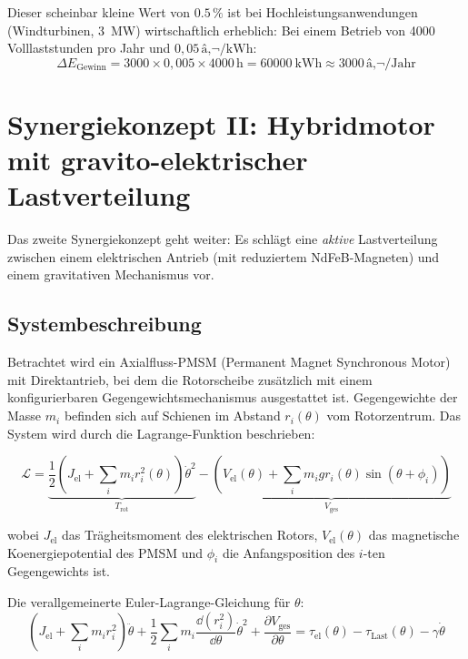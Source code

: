 ﻿\documentclass[12pt, a4paper]{report}
\theoremstyle{definition}
\theoremstyle{remark}
\begin{document}
Dieser scheinbar kleine Wert von $0.5\,\%$ ist bei Hochleistungsanwendungen
(Windturbinen, \SI{3}{\mega\watt}) wirtschaftlich erheblich: Bei einem Betrieb
von 4000 Volllaststunden pro Jahr und $0{,}05\,\text{â‚¬}/\si{\kilo\watt\hour}$:
\begin{equation}
  \Delta E_{\text{Gewinn}} = 3000 \times 0{,}005 \times 4000\,\text{h} = \SI{60000}{\kilo\watt\hour}
  \approx 3000\,\text{â‚¬/Jahr}
\end{equation}

\section{Synergiekonzept II: Hybridmotor mit gravito-elektrischer Lastverteilung}
\label{ssec:synergie2}

Das zweite Synergiekonzept geht weiter: Es schlägt eine \emph{aktive} Lastverteilung
zwischen einem elektrischen Antrieb (mit reduziertem NdFeB-Magneten) und einem
gravitativen Mechanismus vor.

\subsection{Systembeschreibung}

Betrachtet wird ein Axialfluss-PMSM (Permanent Magnet Synchronous Motor) mit
Direktantrieb, bei dem die Rotorscheibe zusätzlich mit einem konfigurierbaren
Gegengewichtsmechanismus ausgestattet ist. Gegengewichte der Masse $m_i$ befinden
sich auf Schienen im Abstand $r_i(\theta)$ vom Rotorzentrum. Das System wird durch
die Lagrange-Funktion beschrieben:

\begin{equation}
  \mathcal{L} = \underbrace{\frac{1}{2}\left(J_{\text{el}} + \sum_i m_i r_i^2(\theta)\right)
                            \dot\theta^2}_{T_{\text{rot}}}
              - \underbrace{\left(V_{\text{el}}(\theta) + \sum_i m_i g r_i(\theta)
                            \sin(\theta+\phi_i)\right)}_{V_{\text{ges}}}
  \label{eq:lagrange_hybrid}
\end{equation}

wobei $J_{\text{el}}$ das Trägheitsmoment des elektrischen Rotors,
$V_{\text{el}}(\theta)$ das magnetische Koenergiepotential des PMSM und
$\phi_i$ die Anfangsposition des $i$-ten Gegengewichts ist.

Die verallgemeinerte Euler-Lagrange-Gleichung für $\theta$:
\begin{equation}
  \left(J_{\text{el}} + \sum_i m_i r_i^2\right)\ddot\theta
  + \frac{1}{2}\sum_i m_i \frac{\dd(r_i^2)}{\dd\theta}\dot\theta^2
  + \frac{\partial V_{\text{ges}}}{\partial\theta}
  = \tau_{\text{el}}(\theta) - \tau_{\text{Last}}(\theta) - \gamma\dot\theta
  \label{eq:euler_lagrange_hybrid}
\end{equation}
\end{document}
